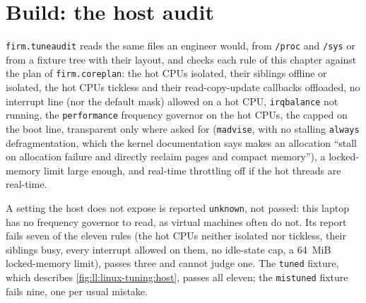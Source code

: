 \section{Build: the host audit}\label{bld:ll:linux-tuning:tuneaudit}

\texttt{firm.tuneaudit} reads the same files an engineer would, from \texttt{/proc} and \texttt{/sys} or from a fixture tree
with their layout, and checks each rule of this chapter against the plan of \texttt{firm.coreplan}: the hot CPUs isolated,
their siblings offline or isolated, the hot CPUs tickless and their read-copy-update callbacks offloaded, no interrupt line
(nor the default mask) allowed on a hot CPU, \texttt{irqbalance} not running, the \texttt{performance} frequency governor on
the hot CPUs, the  capped on the boot line, transparent  only where asked for (\texttt{madvise}, with
no stalling \texttt{always} defragmentation, which the kernel documentation says makes an allocation ``stall on allocation
failure and directly reclaim pages and compact memory''), a locked-memory limit large enough, and real-time throttling off
if the hot threads are real-time.

\label{lst:ll:linux-tuning:audit}

A setting the host does not expose is reported \texttt{unknown}, not passed: this laptop has no frequency governor to read, as
virtual machines often do not. Its report fails seven of the eleven rules (the hot CPUs neither isolated nor tickless, their
siblings busy, every interrupt allowed on them, no idle-state cap, a 64~MiB locked-memory limit), passes three and cannot judge
one. The \texttt{tuned} fixture, which describes \cref{fig:ll:linux-tuning:host}, passes all eleven; the \texttt{mistuned}
fixture fails nine, one per usual mistake.

